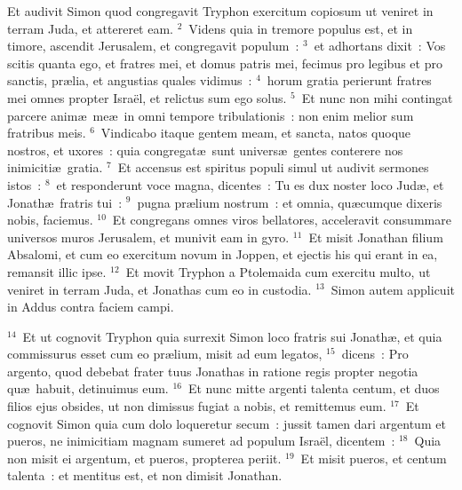 \lettrine[lines=3,image=true,loversize=0.05,lraise=-0.03]{E}{}t audivit Simon quod congregavit Tryphon exercitum copiosum ut veniret in terram Juda, et attereret eam.
${}^{2}$~Videns quia in tremore populus est, et in timore, ascendit Jerusalem, et congregavit populum~:
${}^{3}$~et adhortans dixit~: Vos scitis quanta ego, et fratres mei, et domus patris mei, fecimus pro legibus et pro sanctis, pr\ae lia, et angustias quales vidimus~:
${}^{4}$~horum gratia perierunt fratres mei omnes propter Isra\"el, et relictus sum ego solus.
${}^{5}$~Et nunc non mihi contingat parcere anim\ae\ me\ae\ in omni tempore tribulationis~: non enim melior sum fratribus meis.
${}^{6}$~Vindicabo itaque gentem meam, et sancta, natos quoque nostros, et uxores~: quia congregat\ae\ sunt univers\ae\ gentes conterere nos inimiciti\ae\ gratia.
${}^{7}$~Et accensus est spiritus populi simul ut audivit sermones istos~:
${}^{8}$~et responderunt voce magna, dicentes~: Tu es dux noster loco Jud\ae , et Jonath\ae\ fratris tui~:
${}^{9}$~pugna pr\ae lium nostrum~: et omnia, qu\ae cumque dixeris nobis, faciemus.
${}^{10}$~Et congregans omnes viros bellatores, acceleravit consummare universos muros Jerusalem, et munivit eam in gyro.
${}^{11}$~Et misit Jonathan filium Absalomi, et cum eo exercitum novum in Joppen, et ejectis his qui erant in ea, remansit illic ipse.
${}^{12}$~Et movit Tryphon a Ptolemaida cum exercitu multo, ut veniret in terram Juda, et Jonathas cum eo in custodia.
${}^{13}$~Simon autem applicuit in Addus contra faciem campi.


${}^{14}$~Et ut cognovit Tryphon quia surrexit Simon loco fratris sui Jonath\ae , et quia commissurus esset cum eo pr\ae lium, misit ad eum legatos,
${}^{15}$~dicens~: Pro argento, quod debebat frater tuus Jonathas in ratione regis propter negotia qu\ae\ habuit, detinuimus eum.
${}^{16}$~Et nunc mitte argenti talenta centum, et duos filios ejus obsides, ut non dimissus fugiat a nobis, et remittemus eum.
${}^{17}$~Et cognovit Simon quia cum dolo loqueretur secum~: jussit tamen dari argentum et pueros, ne inimicitiam magnam sumeret ad populum Isra\"el, dicentem~:
${}^{18}$~Quia non misit ei argentum, et pueros, propterea periit.
${}^{19}$~Et misit pueros, et centum talenta~: et mentitus est, et non dimisit Jonathan.


